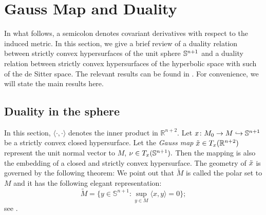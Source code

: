 \section{Gauss Map and Duality}\label{Duality}
\label{gauss_duality}
In what follows, a semicolon denotes covariant derivatives with respect to the induced metric.
In this section, we give a brief review of a duality relation between strictly convex hypersurfaces of the unit sphere $\S^{n+1}$ and a duality relation between strictly convex hypersurfaces of the hyperbolic space with such of the de Sitter space. The relevant results can be found in \cite[Ch.~9, 10]{Gerhardt:/2006}. For convenience, we will state the main results here.
\subsection{Duality in the sphere} In this section, $\langle \cdot,\cdot\rangle$ denotes the inner product in $\mathbb{R}^{n+2}.$
Let $x\cn M_0\ra M\hra \S^{n+1}$ be a strictly convex closed hypersurface. Let the {\it{Gauss map}} $\~x\in T_x(\R^{n+2})$ represent the unit normal vector to $M$, $\nu\in T_x(\S^{n+1}).$ Then the mapping
is also the embedding of a closed and strictly convex hypersurface. The geometry of $\~x$ is governed by the following theorem:
We point out that $\tilde{M}$ is called the polar set to $M$ and it has the following elegant representation:
$$\tilde{M}=\{y\in \mathbb{S}^{n+1}: \sup_{y\in M}\langle x,y\rangle=0\};$$
see \cite[Thm.~9.2.9]{Gerhardt:/2006}.

